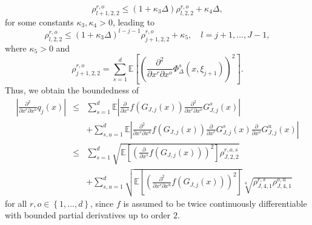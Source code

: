 \documentclass[11pt,a4paper]{amsart}
\theoremstyle{plain}
\theoremstyle{definition}
\theoremstyle{remark}
\numberwithin{equation}{section}
\newcommand*{\EE}{\mathbb E}
\begin{document}
\[
\rho_{l+1,2,2}^{r,o}\leq (1+\kappa_{3}\Delta)\rho_{l,2,2}^{r,o}+\kappa_4\Delta,
\]
for some constants $\kappa_{3},\kappa_4>0$,
leading to
\[
\rho_{l,2,2}^{r,o}\leq(1+\kappa_{3}\Delta)^{l-j-1}\rho_{j+1,2,2}^{r,o}+\kappa_5
,\quad l=j+1,\ldots,J-1,
\]
where $\kappa_5>0$ and
\[
\rho_{j+1,2,2}^{r,o}=\sum_{s=1}^d\EE\left[\left(\frac{\partial^2}{\partial x^r\partial x^o}\Phi_{\Delta}^s\left(x,\xi_{j+1}\right)\right)^{2}\right].
\]
Thus, we obtain the boundedness of 
\begin{eqnarray*}
\left|\frac{\partial^2}{\partial x^r \partial x^o}q_j(x)\right|&\le&\sum_{s=1}^d\EE\left|\frac{\partial }{\partial x^s}f(G_{J,j}(x))\frac{\partial^2}{\partial x^r\partial x^o}G_{J,j}^s(x)\right|\\
&&+\sum_{s,u=1}^d\EE\left|\frac{\partial^2 }{\partial x^s\partial x^u}f(G_{J,j}(x))\frac{\partial}{\partial x^r}G_{J,j}^s(x)\frac{\partial}{\partial x^o}G_{J,j}^u(x)\right|\\
&\le &\sum_{s=1}^d\sqrt{\EE\left[\left(\frac{\partial }{\partial x^s}f(G_{J,j}(x))\right)^2\right]\rho_{J,2,2}^{r,o,s}}\\
&&+\sum_{s,u=1}^d\sqrt{\EE\left[\left(\frac{\partial^2 }{\partial x^s\partial x^u}f(G_{J,j}(x))\right)^2\right]}\sqrt[4]{\rho_{J,4,1}^{r,s}\rho_{J,4,1}^{o,u}}
\end{eqnarray*}
for all $r,o\in\left\{1,\ldots,d\right\}$, since $f$ is assumed to be twice continuously differentiable with bounded partial derivatives up to order $2$.
\end{document}
